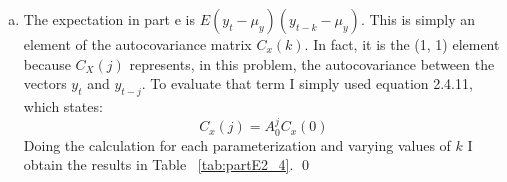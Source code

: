 \documentclass{homework}
\begin{document}
\begin{homeworkProblem}[Problem 2.4]
{\begin{enumerate}[a.]
          Putting the two expectations together, I derive the final expression for $\beta$:

          \begin{align*}
            \beta &= E\left[(XX')^{-1}\right] E[XY] \\
              &= \left(C_x(0) + \mu\mu' \right)^{-1} \left(C_x(0) + \mu\mu' \right) (I - 0.95A)^{-1'}  G' \\
              &= (I - 0.95A)^{-1'}  G'
          \end{align*}

          I then just plugged this in to the included python code and let it go to work on each parameter set to obtain beta.

          \begin{enumerate}
            \item $\beta = \left[\begin{matrix} 7.648 &  -2.180 &  0.000 &  0.000 &  145.315 \end{matrix}\right]$
            \item $\beta = \left[\begin{matrix} 7.648 &  -2.180 &  0.000 &  0.000 &  145.315 \end{matrix}\right]$
            \item $\beta = \left[\begin{matrix} 6.897 &  -0.000 &  -0.000 &  0.000 &  65.517 \end{matrix}\right]$
            \item $\beta = \left[\begin{matrix} 2.483 &  1.064 &  1.120 &  1.179 &  70.764  \end{matrix}\right]$
            \item  Not all eigenvalues are less than 1 in modulus, so there is no set of covariance stationary initial conditions, so there is no answer to this problem.
          \end{enumerate} \qed

        \item The expectation in part e is $E(y_t - \mu_y)(y_{t-k} - \mu_y)$. This is simply an element of the  autocovariance matrix $C_x(k)$. In fact, it is the (1, 1) element because $C_X(j)$ represents, in this problem, the autocovariance between the vectors $y_t$ and $y_{t-j}$. To evaluate that term I simply used equation 2.4.11, which states: $$C_x(j) = A_0^j C_x(0)$$ Doing the calculation for each parameterization and varying values of $k$ I obtain the results in Table ~\ref{tab:partE2_4}. \qed


\end{enumerate}}
\end{homeworkProblem}
\end{document}

